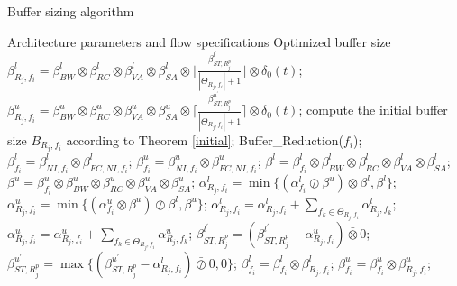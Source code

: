 \documentclass[preprint]{elsarticle}
\begin{document}
\begin{algorithm}
\caption{Buffer sizing algorithm}
\label{alg:bufopt}
\begin{algorithmic}[1]
\Require Architecture parameters and flow specifications
\Ensure Optimized buffer size
            \State $\beta_{R_j,f_i}^l=\beta_{BW}^l\otimes\beta_{RC}^l\otimes\beta_{VA}^l\otimes\beta_{SA}^l\otimes\lfloor\frac{\beta_{ST,R_j^{p}}^{l^\prime}}{|\Theta_{R_j,f_i}|+1}\rfloor\otimes\delta_0(t)$;
            \State $\beta_{R_j,f_i}^u=\beta_{BW}^u\otimes\beta_{RC}^u\otimes\beta_{VA}^u\otimes\beta_{SA}^u\otimes\lceil\frac{\beta_{ST,R_j^{p}}^{u^\prime}}{|\Theta_{R_j,f_i}|+1}\rceil\otimes\delta_0(t)$;
            \State compute the initial buffer size $B_{R_j,f_i}$ according to Theorem \ref{initial};
        \EndFor
        \State Buffer\_Reduction($f_i$);
        \State $\beta_{f_i}^l=\beta_{NI,f_i}^l\otimes\beta_{FC,NI,f_i}^l$; $\beta_{f_i}^u=\beta_{NI,f_i}^u\otimes\beta_{FC,NI,f_i}^u$;
                \State $\beta^l=\beta^l_{f_i}\otimes\beta_{BW}^l\otimes\beta_{RC}^l\otimes\beta_{VA}^l\otimes\beta_{SA}^l$;
                \State $\beta^u=\beta^u_{f_i}\otimes\beta_{BW}^u\otimes\beta_{RC}^u\otimes\beta_{VA}^u\otimes\beta_{SA}^u$;
                \State $\alpha^l_{R_j,f_i}=\min\{(\alpha^l_{f_i}\oslash\beta^u)\otimes\beta^l,\beta^l\}$;
                \State $\alpha^u_{R_j,f_i}=\min\{(\alpha^u_{f_i}\otimes\beta^u)\oslash\beta^l,\beta^u\}$;
                    \State $\alpha^l_{R_j,f_i}=\alpha^l_{R_j,f_i}+\sum_{f_k\in\Theta_{R_j,f_i}}\alpha^l_{R_j,f_k}$;
                    \State $\alpha^u_{R_j,f_i}=\alpha^u_{R_j,f_i}+\sum_{f_k\in\Theta_{R_j,f_i}}\alpha^u_{R_j,f_k}$;
                    \State $\beta^{l^\prime}_{ST,R_j^{p}}=(\beta^{l^\prime}_{ST,R_j^{p}}-\alpha^u_{R_j,f_i})\bar{\otimes}0$;
                    \State $\beta^{u^\prime}_{ST,R_j^{p}}=\max\{(\beta^{u^\prime}_{ST,R_j^{p}}-\alpha^l_{R_j,f_i})\bar{\oslash}0,0\}$;
                \EndIf
            \EndIf
            \State $\beta_{f_i}^l=\beta_{f_i}^l\otimes\beta^l_{R_j,f_i}$; $\beta_{f_i}^u=\beta_{f_i}^u\otimes\beta^u_{R_j,f_i}$;
        \EndFor
    \EndFor
\end{algorithmic}
\end{algorithm}
\end{document}
